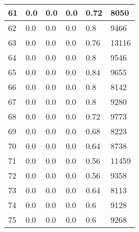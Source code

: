 \begin{longtable}{|l|l|l|l|l|l|}
61 & 0.0 & 0.0 & 0.0 & 0.72 & 8050 \\ \hline 
62 & 0.0 & 0.0 & 0.0 & 0.8 & 9466 \\ \hline 
63 & 0.0 & 0.0 & 0.0 & 0.76 & 13116 \\ \hline 
64 & 0.0 & 0.0 & 0.0 & 0.8 & 9546 \\ \hline 
65 & 0.0 & 0.0 & 0.0 & 0.84 & 9655 \\ \hline 
66 & 0.0 & 0.0 & 0.0 & 0.8 & 8142 \\ \hline 
67 & 0.0 & 0.0 & 0.0 & 0.8 & 9280 \\ \hline 
68 & 0.0 & 0.0 & 0.0 & 0.72 & 9773 \\ \hline 
69 & 0.0 & 0.0 & 0.0 & 0.68 & 8223 \\ \hline 
70 & 0.0 & 0.0 & 0.0 & 0.64 & 8738 \\ \hline 
71 & 0.0 & 0.0 & 0.0 & 0.56 & 11459 \\ \hline 
72 & 0.0 & 0.0 & 0.0 & 0.56 & 9358 \\ \hline 
73 & 0.0 & 0.0 & 0.0 & 0.64 & 8113 \\ \hline 
74 & 0.0 & 0.0 & 0.0 & 0.6 & 9128 \\ \hline 
75 & 0.0 & 0.0 & 0.0 & 0.6 & 9268 \\ \hline 
\end{longtable}